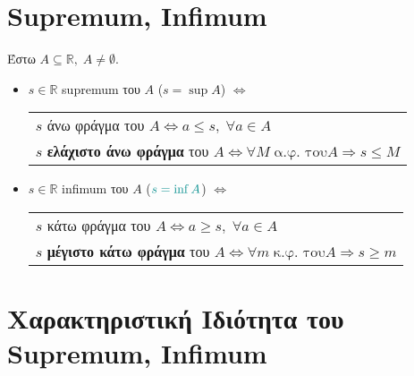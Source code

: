\section{Supremum, Infimum}

\begin{dfn}
    Έστω $ A \subseteq \mathbb{R}, \; A \neq \emptyset $.
    \begin{itemize}[label=\textcolor{Col1}{\tiny$\blacksquare$}]
        \item $ s \in \mathbb{R} $ \textcolor{Col1}{supremum} του $A$ 
          (\textcolor{Col2}{$s = \sup A $}) 
            $ \Leftrightarrow $ 
            \begin{tabular}[t]{l}
                $s$ άνω φράγμα του $A \Leftrightarrow a \leq s, \; \forall a 
                \in A $ \\
                $s$ \textbf{ελάχιστο άνω φράγμα} του $A  \Leftrightarrow 
                \forall M \; \text{α.φ.\ του} A \Rightarrow s \leq M $
            \end{tabular} 

        \item $ s \in \mathbb{R} $ \textcolor{Col1}{infimum} του $A$ 
            ($ \textcolor{Col2}{s= \inf A} $) 
            $ \Leftrightarrow $ 
            \begin{tabular}[t]{l}
                $s$ κάτω φράγμα του $A \Leftrightarrow a \geq s, \; \forall a 
                \in A $ \\
                $s$ \textbf{μέγιστο κάτω φράγμα} του $A \Leftrightarrow 
                \forall m \; \text{κ.φ.\ του} A \Rightarrow s \geq m $
            \end{tabular} 
    \end{itemize}
\end{dfn}

\section{Χαρακτηριστική Ιδιότητα του Supremum, Infimum}

